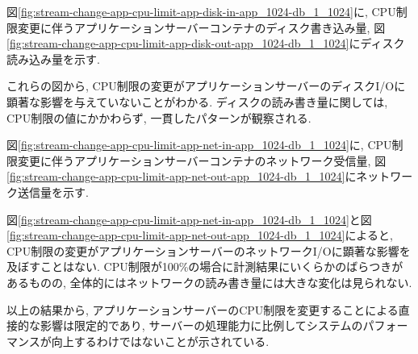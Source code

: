 \documentclass[../../../../main]{subfiles}
\begin{document}
    図\ref{fig:stream-change-app-cpu-limit-app-disk-in-app_1024-db_1_1024}に, CPU制限変更に伴うアプリケーションサーバーコンテナのディスク書き込み量, 図\ref{fig:stream-change-app-cpu-limit-app-disk-out-app_1024-db_1_1024}にディスク読み込み量を示す.

    
    

    これらの図から, CPU制限の変更がアプリケーションサーバーのディスクI/Oに顕著な影響を与えていないことがわかる. ディスクの読み書き量に関しては, CPU制限の値にかかわらず, 一貫したパターンが観察される.


    図\ref{fig:stream-change-app-cpu-limit-app-net-in-app_1024-db_1_1024}に, CPU制限変更に伴うアプリケーションサーバーコンテナのネットワーク受信量, 図\ref{fig:stream-change-app-cpu-limit-app-net-out-app_1024-db_1_1024}にネットワーク送信量を示す.

    
    

    図\ref{fig:stream-change-app-cpu-limit-app-net-in-app_1024-db_1_1024}と図\ref{fig:stream-change-app-cpu-limit-app-net-out-app_1024-db_1_1024}によると, CPU制限の変更がアプリケーションサーバーのネットワークI/Oに顕著な影響を及ぼすことはない. CPU制限が100\%の場合に計測結果にいくらかのばらつきがあるものの, 全体的にはネットワークの読み書き量には大きな変化は見られない.

    以上の結果から, アプリケーションサーバーのCPU制限を変更することによる直接的な影響は限定的であり, サーバーの処理能力に比例してシステムのパフォーマンスが向上するわけではないことが示されている.
\end{document}

